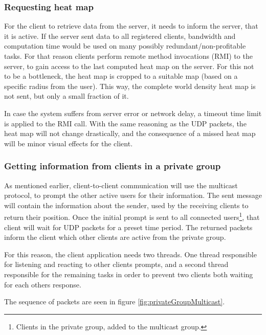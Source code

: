 \subsubsection{Requesting heat map}
For the client to retrieve data from the server, it needs to inform the server, that it is active. If the server sent data to all registered clients, bandwidth and computation time would be used on many possibly redundant/non-profitable tasks. For that reason clients perform remote method invocations (RMI) to the server, to gain access to the last computed heat map on the server. For this not to be a bottleneck, the heat map is cropped to a suitable map (based on a specific radius from the user). This way, the complete world density heat map is not sent, but only a small fraction of it.

In case the system suffers from server error or network delay, a timeout time limit is applied to the RMI call. With the same reasoning as the UDP packets, the heat map will not change drastically, and the consequence of a missed heat map will be minor visual effects for the client.


\subsubsection{Getting information from clients in a private group}

As mentioned earlier, client-to-client communication will use the multicast protocol, to prompt the other active users for their information. The sent message will contain the information about the sender, used by the receiving clients to return their position. Once the initial prompt is sent to all connected users\footnote{Clients in the private group, added to the multicast group.}, that client will wait for UDP packets for a preset time period. The returned packets inform the client which other clients are active from the private group.

For this reason, the client application needs two threads. One thread responsible for listening and reacting to other clients prompts, and a second thread responsible for the remaining tasks in order to prevent two clients both waiting for each others response.

The sequence of packets are seen in figure \ref{fig:privateGroupMulticast}.

